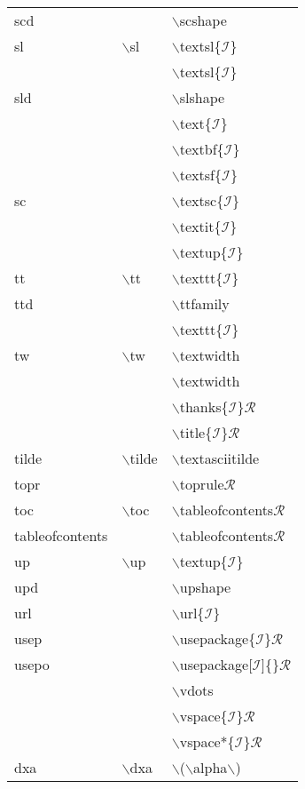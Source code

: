 \begin{longtable}{p{20mm}p{20mm}p{65mm}}
scd &  & $\backslash$scshape\\
sl & $\backslash$sl & $\backslash$textsl\{$\mathcal{I}$\}\\
 &  & $\backslash$textsl\{$\mathcal{I}$\}\\
sld &  & $\backslash$slshape\\
 &  & $\backslash$text\{$\mathcal{I}$\}\\
 &  & $\backslash$textbf\{$\mathcal{I}$\}\\
 &  & $\backslash$textsf\{$\mathcal{I}$\}\\
sc &  & $\backslash$textsc\{$\mathcal{I}$\}\\
 &  & $\backslash$textit\{$\mathcal{I}$\}\\
 &  & $\backslash$textup\{$\mathcal{I}$\}\\
tt & $\backslash$tt & $\backslash$texttt\{$\mathcal{I}$\}\\
ttd &  & $\backslash$ttfamily\\
 &  & $\backslash$texttt\{$\mathcal{I}$\}\\
tw & $\backslash$tw & $\backslash$textwidth\\
 &  & $\backslash$textwidth\\
 &  & $\backslash$thanks\{$\mathcal{I}$\}$\mathcal{R}$\\
 &  & $\backslash$title\{$\mathcal{I}$\}$\mathcal{R}$\\
tilde & $\backslash$tilde & $\backslash$textasciitilde\\
topr &  & $\backslash$toprule$\mathcal{R}$\\
toc & $\backslash$toc & $\backslash$tableofcontents$\mathcal{R}$\\
tableofcontents &  & $\backslash$tableofcontents$\mathcal{R}$\\
up & $\backslash$up & $\backslash$textup\{$\mathcal{I}$\}\\
upd &  & $\backslash$upshape\\
url &  & $\backslash$url\{$\mathcal{I}$\}\\
usep &  & $\backslash$usepackage\{$\mathcal{I}$\}$\mathcal{R}$\\
usepo &  & $\backslash$usepackage[$\mathcal{I}$]\{\}$\mathcal{R}$\\
 &  & $\backslash$vdots\\
 &  & $\backslash$vspace\{$\mathcal{I}$\}$\mathcal{R}$\\
 &  & $\backslash$vspace*\{$\mathcal{I}$\}$\mathcal{R}$\\
dxa & $\backslash$dxa & $\backslash$($\backslash$alpha$\backslash$)\\

\end{longtable}
